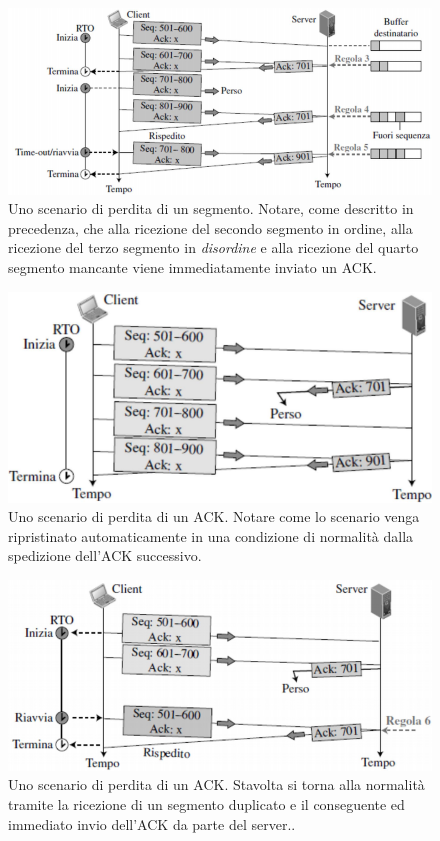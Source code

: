 \documentclass[11pt,a4paper]{article}
\theoremstyle{definition}
\begin{document}
\newpage
\begin{figure}[!h]
	\includegraphics[scale=0.3]{Immagini/Loss_op.png}
	\centering
	\caption{Uno scenario di perdita di un segmento. Notare, come descritto in precedenza, che alla ricezione del secondo segmento in ordine, alla ricezione del terzo segmento in \textit{disordine} e alla ricezione del quarto segmento mancante viene immediatamente inviato un ACK.}
\end{figure}
\begin{figure}[!h]
	\includegraphics[scale=0.3]{Immagini/ACK_lost.png}
	\centering
	\caption{Uno scenario di perdita di un ACK. Notare come lo scenario venga ripristinato automaticamente in una condizione di normalità dalla spedizione dell'ACK successivo.}
\end{figure}
\begin{figure}[!h]
	\includegraphics[scale=0.25]{Immagini/ACK_retr.png}
	\centering
	\caption{Uno scenario di perdita di un ACK. Stavolta si torna alla normalità tramite la ricezione di un segmento duplicato e il conseguente ed immediato invio dell'ACK da parte del server..}
\end{figure}
\end{document}
